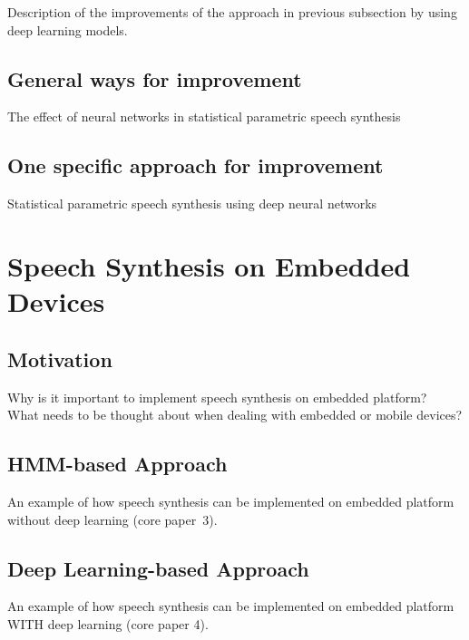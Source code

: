 Description of the improvements of the approach in previous subsection by using deep learning models.

\subsection{General ways for improvement}
\label{subsec:deepeffect}

The effect of neural networks in statistical parametric speech synthesis \cite{hashimoto:effect}

\subsection{One specific approach for improvement}
\label{subsec:deepspss}

Statistical parametric speech synthesis using deep neural networks \cite{zen:deepstatistical}

\section{Speech Synthesis on Embedded Devices}
\label{sec:embeddedspeech}

\subsection{Motivation}
\label{subsec:motembedded}

Why is it important to implement speech synthesis on embedded platform?\\
What needs to be thought about when dealing with embedded or mobile devices?

\subsection{\ac{HMM}-based Approach}
\label{subsec:hmmembedded}

An example of how speech synthesis can be implemented on embedded platform without deep learning (core paper~3).

\subsection{Deep Learning-based Approach}
\label{subsec:deepembedded}

An example of how speech synthesis can be implemented on embedded platform WITH deep learning (core paper 4).

\clearpage

